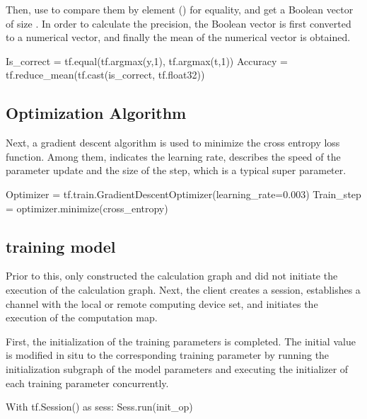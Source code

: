 \begin{content}
Then, use  to compare them by element () for equality, and get a Boolean vector of size . In order to calculate the precision, the Boolean vector is first converted to a numerical vector, and finally the mean of the numerical vector is obtained.

\begin{leftbar}
\begin{python}
Is_correct = tf.equal(tf.argmax(y,1), tf.argmax(t,1))
Accuracy = tf.reduce_mean(tf.cast(is_correct, tf.float32))
\end{python}
\end{leftbar}

\subsection{Optimization Algorithm}

Next, a gradient descent algorithm is used to minimize the cross entropy loss function. Among them,  indicates the learning rate, describes the speed of the parameter update and the size of the step, which is a typical super parameter.

\begin{leftbar}
\begin{python}
Optimizer = tf.train.GradientDescentOptimizer(learning_rate=0.003)
Train_step = optimizer.minimize(cross_entropy)
\end{python}
\end{leftbar}

\subsection{training model}

Prior to this, \tf{} only constructed the calculation graph and did not initiate the execution of the calculation graph. Next, the client creates a session, establishes a channel with the local or remote computing device set, and initiates the execution of the computation map.

First, the initialization of the training parameters is completed. The initial value is modified in situ to the corresponding training parameter by running the initialization subgraph of the model parameters and executing the initializer of each training parameter concurrently.

\begin{leftbar}
\begin{python}
With tf.Session() as sess:
  Sess.run(init_op)
\end{python}
\end{leftbar}


\end{content}
